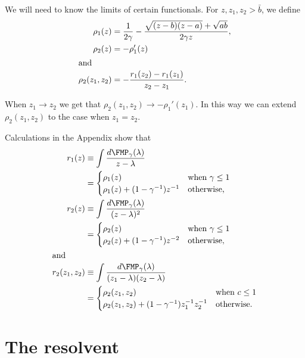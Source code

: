 We will need to know the limits of certain functionals.  For
$z, z_1, z_2 > \bar b$, we define
\begin{align*}
    \rho_1(z)
        &=
        \frac{1}{2 \gamma}
        -
        \frac{\sqrt{(z - b)(z - a)} + \sqrt{ a b}}
             {2 \gamma z}, \\
    \rho_2(z)
        &= -\rho_{1}'(z) \\
\intertext{and}
    \rho_2(z_1, z_2)
        &= - \frac{r_1(z_2) - r_1(z_1)}{z_2 - z_1}.
\end{align*}

\noindent
When $z_1 \to z_2$ we get that $\rho_2 (z_1, z_2) \to - \rho_1'(z_1)$.  In this way we can extend $\rho_2 (z_1, z_2)$ to the case when $z_1 = z_2$.

Calculations in the Appendix show that
\begin{align}
    r_{1}(z)
        &\equiv \int \frac{d\FMP_\gamma(\lambda)}{z - \lambda} \notag \\
        &= \begin{cases}
               \rho_1(z) &\text{when $\gamma \leq 1$} \\
               \rho_1(z) + (1 - \gamma^{-1}) z^{-1} &\text{otherwise,}
           \end{cases} 
           \label{E:r1-z} \\
    r_{2}(z)
        &\equiv \int \frac{d\FMP_\gamma(\lambda)}{(z - \lambda)^2} \notag \\
        &= \begin{cases}
               \rho_2(z) &\text{when $\gamma \leq 1$} \\
               \rho_2(z) + (1 - \gamma^{-1}) z^{-2} &\text{otherwise,}
           \end{cases} 
           \label{E:r2-z} \\
\intertext{and}
    r_2(z_1, z_2)
        &\equiv \int \frac{d\FMP_\gamma(\lambda)}
                          {(z_1 - \lambda)(z_2 - \lambda)} \notag \\    
        &= \begin{cases}
               \rho_2(z_1, z_2) &\text{when $c \leq 1$} \\
               \rho_2(z_1, z_2) + (1 - \gamma^{-1}) z_1^{-1} z_2^{-1} &\text{otherwise.}
           \end{cases} 
           \label{E:r2-z1-z2}
\end{align}


\section{The resolvent}\label{S:resolvent}

